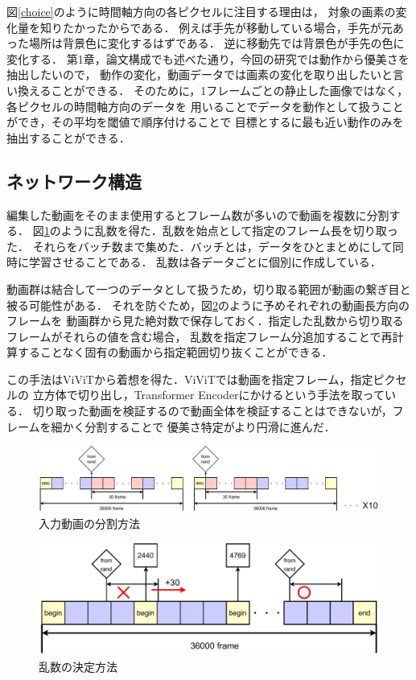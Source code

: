 図\ref{choice}のように時間軸方向の各ピクセルに注目する理由は，
対象の画素の変化量を知りたかったからである．
例えば手先が移動している場合，手先が元あった場所は背景色に変化するはずである．
逆に移動先では背景色が手先の色に変化する．
第1章，論文構成でも述べた通り，今回の研究では動作から優美さを抽出したいので，
動作の変化，動画データでは画素の変化を取り出したいと言い換えることができる．
そのために，1フレームごとの静止した画像ではなく，各ピクセルの時間軸方向のデータを
用いることでデータを動作として扱うことができ，その平均を閾値で順序付けることで
目標とするに最も近い動作のみを抽出することができる．
\clearpage

\subsection{ネットワーク構造}
編集した動画をそのまま使用するとフレーム数が多いので動画を複数に分割する．
図\ref{range}のように乱数を得た．乱数を始点として指定のフレーム長を切り取った．
それらをバッチ数まで集めた．バッチとは，データをひとまとめにして同時に学習させることである．
乱数は各データごとに個別に作成している．

動画群は結合して一つのデータとして扱うため，切り取る範囲が動画の繋ぎ目と被る可能性がある．
それを防ぐため，図\ref{decide_rand}のように予めそれぞれの動画長方向のフレームを
動画群から見た絶対数で保存しておく．指定した乱数から切り取るフレームがそれらの値を含む場合，
乱数を指定フレーム分追加することで再計算することなく固有の動画から指定範囲切り抜くことができる．

この手法はViViT\cite{vivit}から着想を得た．ViViTでは動画を指定フレーム，指定ピクセルの
立方体で切り出し，Transformer Encoderにかけるという手法を取っている．
切り取った動画を検証するので動画全体を検証することはできないが，フレームを細かく分割することで
優美さ特定がより円滑に進んだ．

\begin{figure}[b]
  \begin{center}
    \includegraphics[width=120mm]{images/chart/range.pdf}
  \end{center}
  \caption{入力動画の分割方法}
  \label{range}
\end{figure}

\begin{figure}[b]
  \begin{center}
    \includegraphics[width=120mm]{images/chart/decide_rand.pdf}
  \end{center}
  \caption{乱数の決定方法}
  \label{decide_rand}
\end{figure}
\clearpage

